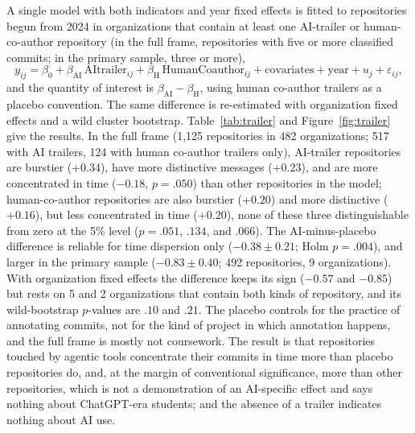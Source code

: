 \documentclass[acmsmall,screen,review,anonymous]{acmart}
\begin{document}
A single model with both indicators and year fixed effects is fitted to repositories begun from 2024 in organizations that contain at least one AI-trailer or human-co-author repository (in the full frame, repositories with five or more classified commits; in the primary sample, three or more),
\begin{equation}
y_{ij} = \beta_0 + \beta_{\mathrm{AI}}\,\mathrm{AItrailer}_{ij} + \beta_{\mathrm{H}}\,\mathrm{HumanCoauthor}_{ij} + \text{covariates} + \text{year} + u_j + \varepsilon_{ij},
\label{eq:trailer}
\end{equation}
and the quantity of interest is $\beta_{\mathrm{AI}} - \beta_{\mathrm{H}}$, using human co-author trailers as a placebo convention. The same difference is re-estimated with organization fixed effects and a wild cluster bootstrap. Table~\ref{tab:trailer} and Figure~\ref{fig:trailer} give the results. In the full frame (1,125 repositories in 482 organizations; 517 with AI trailers, 124 with human co-author trailers only), AI-trailer repositories are burstier ($+0.34$), have more distinctive messages ($+0.23$), and are more concentrated in time ($-0.18$, $p = .050$) than other repositories in the model; human-co-author repositories are also burstier ($+0.20$) and more distinctive ($+0.16$), but less concentrated in time ($+0.20$), none of these three distinguishable from zero at the 5\% level ($p = .051$, $.134$, and $.066$). The AI-minus-placebo difference is reliable for time dispersion only ($-0.38 \pm 0.21$; Holm $p = .004$), and larger in the primary sample ($-0.83 \pm 0.40$; 492 repositories, 9 organizations). With organization fixed effects the difference keeps its sign ($-0.57$ and $-0.85$) but rests on 5 and 2 organizations that contain both kinds of repository, and its wild-bootstrap $p$-values are $.10$ and $.21$. The placebo controls for the practice of annotating commits, not for the kind of project in which annotation happens, and the full frame is mostly not coursework. The result is that repositories touched by agentic tools concentrate their commits in time more than placebo repositories do, and, at the margin of conventional significance, more than other repositories, which is not a demonstration of an AI-specific effect and says nothing about ChatGPT-era students; and the absence of a trailer indicates nothing about AI use.


\end{document}
